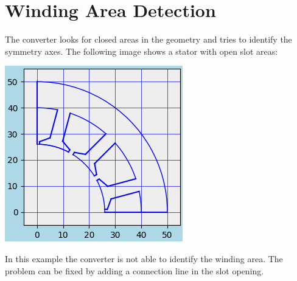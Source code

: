 \documentclass[10pt, a4paper,german]{scrartcl}
\newcommand{\Slanted}[1]{{\normalfont\slshape #1}}
\newcommand{\LongArg}[1]{\mbox{{-}{-}#1}}
\begin{document}
\begin{itemize}



\end{itemize}

\section{Winding Area Detection}
The converter looks for closed areas in the geometry and tries to identify
the symmetry axes. The following image shows a stator with open slot areas:
\begin{center}
\includegraphics[width=0.45\linewidth]{BspStator}
\end{center}
In this example the converter is not able to identify the winding area.
The problem can be fixed by adding a connection line in the slot opening.
\end{document}

